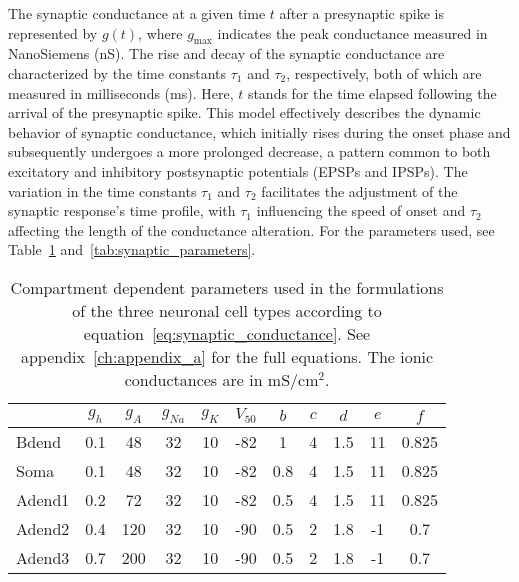 The synaptic conductance at a given time \(t\) after a presynaptic spike is represented by \(g(t)\), where \(g_{\text{max}}\) indicates the peak conductance measured in NanoSiemens (nS).
The rise and decay of the synaptic conductance are characterized by the time constants \(\tau_1\) and \(\tau_2\), respectively, both of which are measured in milliseconds (ms).
Here, \(t\) stands for the time elapsed following the arrival of the presynaptic spike.
This model effectively describes the dynamic behavior of synaptic conductance, which initially rises during the onset phase and subsequently undergoes a more prolonged decrease, a pattern common to both excitatory and inhibitory postsynaptic potentials (EPSPs and IPSPs).
The variation in the time constants \(\tau_1\) and \(\tau_2\) facilitates the adjustment of the synaptic response's time profile, with \(\tau_1\) influencing the speed of onset and \(\tau_2\) affecting the length of the conductance alteration.
For the parameters used, see Table~\ref{table:compartment_dependent_parameters} and~\ref{tab:synaptic_parameters}.
\begin{table}[htbp]
    \centering
    \caption[Compartment dependent parameters]{Compartment dependent parameters used in the formulations of the three neuronal cell types according to equation~\ref{eq:synaptic_conductance}.
        See appendix~\ref{ch:appendix_a} for the full equations.
        The ionic conductances are in mS/cm\(^2\).}\label{table:compartment_dependent_parameters}
    \begin{tabular}{l|cccccccccc}
        \hline
        \hline
               & \( g_{h} \) & \( g_{A} \) & \( g_{Na} \) & \( g_{K} \) & \( V_{50} \) & \( b \) & \( c \) & \( d \) & \( e \) & \( f \) \\
        \hline
        Bdend  & 0.1         & 48          & 32           & 10          & -82          & 1       & 4       & 1.5     & 11      & 0.825   \\
        Soma   & 0.1         & 48          & 32           & 10          & -82          & 0.8     & 4       & 1.5     & 11      & 0.825   \\
        Adend1 & 0.2         & 72          & 32           & 10          & -82          & 0.5     & 4       & 1.5     & 11      & 0.825   \\
        Adend2 & 0.4         & 120         & 32           & 10          & -90          & 0.5     & 2       & 1.8     & -1      & 0.7     \\
        Adend3 & 0.7         & 200         & 32           & 10          & -90          & 0.5     & 2       & 1.8     & -1      & 0.7     \\
        \hline
        \hline
    \end{tabular}
\end{table}
\pagebreak

